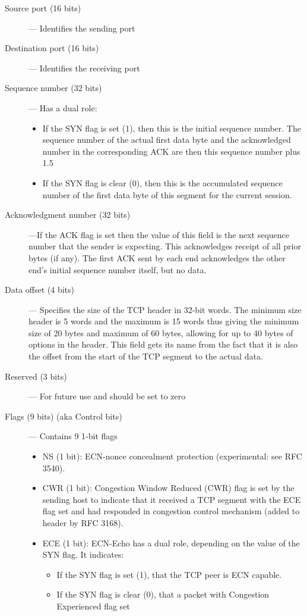 \documentclass[12pt]{article}
\theoremstyle{definition}
\begin{document}
			
			\begin{description}
				\item[Source port (16 bits)] --- Identifies the sending port
				\item[Destination port (16 bits)] --- Identifies the receiving port
				\item[Sequence number (32 bits)] --- 
					Has a dual role: 
					\begin{itemize}
						\item If the SYN flag is set (1), then this is the initial sequence number. The sequence number of the actual first data byte and the acknowledged number in the corresponding ACK are then this sequence number plus 1.5
						
						\item If the SYN flag is clear (0), then this is the accumulated sequence number of the first data byte of this segment for the current session.
					\end{itemize}
				\item [Acknowledgment number (32 bits)] ---If the ACK flag is set then the value of this field is the next sequence number that the sender is expecting. This acknowledges receipt of all prior bytes (if any). The first ACK sent by each end acknowledges the other end's initial sequence number itself, but no data.
				
				\item [Data offset (4 bits)] ---
				Specifies the size of the TCP header in 32-bit words. The minimum size header is 5 words and the maximum is 15 words thus giving the minimum size of 20 bytes and maximum of 60 bytes, allowing for up to 40 bytes of options in the header. This field gets its name from the fact that it is also the offset from the start of the TCP segment to the actual data.
				
				\item [Reserved (3 bits)] --- 
				For future use and should be set to zero
				
				\item [Flags (9 bits) (aka Control bits)] ---
				Contains 9 1-bit flags
				\begin{itemize}
					\item NS (1 bit): ECN-nonce concealment protection (experimental: see RFC 3540).
					\item CWR (1 bit): Congestion Window Reduced (CWR) flag is set by the sending host to indicate that it received a TCP segment with the ECE flag set and had responded in congestion control mechanism (added to header by RFC 3168).
					\item ECE (1 bit): ECN-Echo has a dual role, depending on the value of the SYN flag. It indicates:
					\begin{itemize}
						\item If the SYN flag is set (1), that the TCP peer is ECN capable.
						\item If the SYN flag is clear (0), that a packet with Congestion Experienced flag set 
					\end{itemize}
				

\end{itemize}
\end{description}
\end{document}
